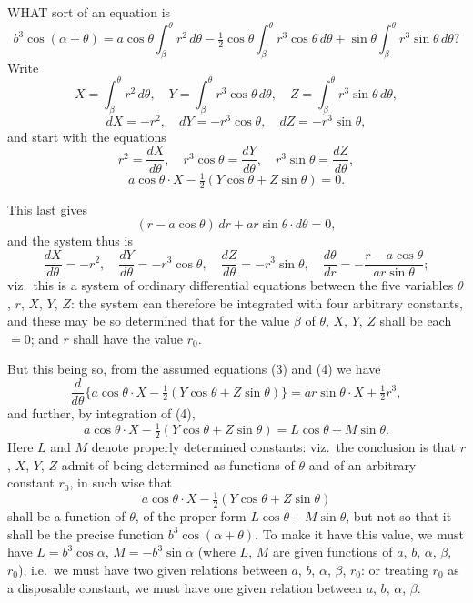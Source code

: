 \documentclass[11pt,a4paper]{book}
\begin{document}
WHAT sort of an equation is
\begin{equation}
b^3 \cos(\alpha + \theta) = a\cos\theta \int_\beta^\theta r^2\,d\theta - \tfrac{1}{2}\cos\theta \int_\beta^\theta r^3\cos\theta\,d\theta + \sin\theta \int_\beta^\theta r^3\sin\theta\,d\theta \tag{1}?
\end{equation}
Write
\begin{equation}
X = \int_\beta^\theta r^2\,d\theta,\quad Y = \int_\beta^\theta r^3\cos\theta\,d\theta,\quad Z = \int_\beta^\theta r^3\sin\theta\,d\theta \tag{2},
\end{equation}
\begin{equation}
dX = -r^2,\quad dY = -r^3\cos\theta,\quad dZ = -r^3\sin\theta \tag{3},
\end{equation}
and start with the equations
\[
r^2 = \frac{dX}{d\theta},\quad r^3\cos\theta = \frac{dY}{d\theta},\quad r^3\sin\theta = \frac{dZ}{d\theta},
\]
\begin{equation}
a\cos\theta \cdot X - \tfrac{1}{2}(Y\cos\theta + Z\sin\theta) = 0 \tag{4}.
\end{equation}

This last gives
\begin{equation}
(r - a\cos\theta)\,dr + ar\sin\theta \cdot d\theta = 0 \tag{5},
\end{equation}
and the system thus is
\[
\frac{dX}{d\theta} = -r^2,\quad \frac{dY}{d\theta} = -r^3\cos\theta,\quad \frac{dZ}{d\theta} = -r^3\sin\theta,\quad \frac{d\theta}{dr} = -\frac{r-a\cos\theta}{ar\sin\theta};
\]
viz.\ this is a system of ordinary differential equations between the five variables $\theta$, $r$, $X$, $Y$, $Z$: the system can therefore be integrated with four arbitrary constants, and these may be so determined that for the value $\beta$ of $\theta$, $X$, $Y$, $Z$ shall be each $=0$; and $r$ shall have the value $r_0$.

But this being so, from the assumed equations (3) and (4) we have
\[
\frac{d}{d\theta}\{a\cos\theta \cdot X - \tfrac{1}{2}(Y\cos\theta + Z\sin\theta)\} = ar\sin\theta \cdot X + \tfrac{1}{2}r^3,
\]
and further, by integration of (4),
\[
a\cos\theta \cdot X - \tfrac{1}{2}(Y\cos\theta + Z\sin\theta) = L\cos\theta + M\sin\theta.
\]
Here $L$ and $M$ denote properly determined constants: viz.\ the conclusion is that $r$, $X$, $Y$, $Z$ admit of being determined as functions of $\theta$ and of an arbitrary constant $r_0$, in such wise that
\[
a\cos\theta \cdot X - \tfrac{1}{2}(Y\cos\theta + Z\sin\theta)
\]
shall be a function of $\theta$, of the proper form $L\cos\theta + M\sin\theta$, but not so that it shall be the precise function $b^3\cos(\alpha + \theta)$. To make it have this value, we must have $L = b^3\cos\alpha$, $M = -b^3\sin\alpha$ (where $L$, $M$ are given functions of $a$, $b$, $\alpha$, $\beta$, $r_0$), i.e.\ we must have two given relations between $a$, $b$, $\alpha$, $\beta$, $r_0$: or treating $r_0$ as a disposable constant, we must have one given relation between $a$, $b$, $\alpha$, $\beta$.
\end{document}
